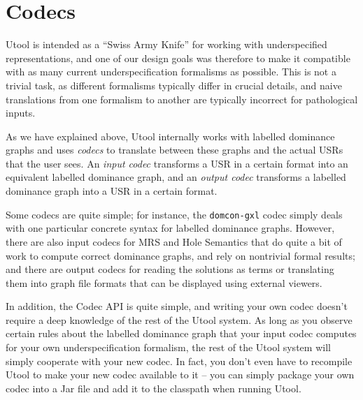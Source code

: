 \section{Codecs}  \label{sec:codecs}


Utool is intended as a ``Swiss Army Knife'' for working with
underspecified representations, and one of our design goals was
therefore to make it compatible with as many current
underspecification formalisms as possible. This is not a trivial task,
as different formalisms typically differ in crucial details, and naive
translations from one formalism to another are typically incorrect for
pathological inputs.

As we have explained above, Utool internally works with labelled
dominance graphs and uses \emph{codecs} to translate between these
graphs and the actual USRs that the user sees. An \emph{input codec}
transforms a USR in a certain format into an equivalent labelled
dominance graph, and an \emph{output codec} transforms a labelled
dominance graph into a USR in a certain format. 

Some codecs are quite simple; for instance, the \verb?domcon-gxl?
codec simply deals with one particular concrete syntax for labelled
dominance graphs. However, there are also input codecs for MRS and
Hole Semantics that do quite a bit of work to compute correct
dominance graphs, and rely on nontrivial formal results; and there are
output codecs for reading the solutions as terms or translating them
into graph file formats that can be displayed using external viewers.

In addition, the Codec API is quite simple, and writing your own codec
doesn't require a deep knowledge of the rest of the Utool system. As
long as you observe certain rules about the labelled dominance graph
that your input codec computes for your own underspecification
formalism, the rest of the Utool system will simply cooperate with
your new codec. In fact, you don't even have to recompile Utool to
make your new codec available to it -- you can simply package your own
codec into a Jar file and add it to the classpath when running Utool.

